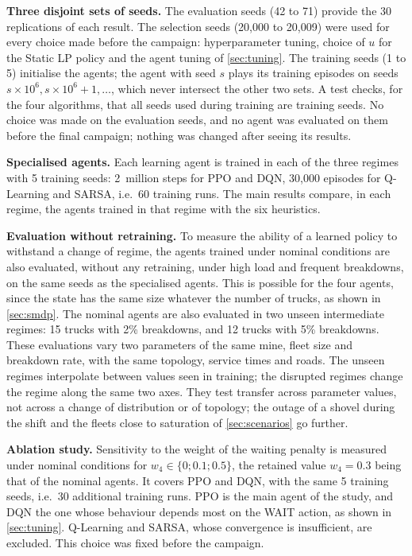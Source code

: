 \documentclass[11pt,a4paper]{article}
\newif\ifrevmarks
\newcommand{\revtag}[1]{\ifrevmarks\textsuperscript{\textcolor{red!70!black}{\scriptsize[#1]}}\fi}
\newenvironment{revbloc}[1]{\par\ifrevmarks\color{revcolor}\noindent\revtag{#1}\ \fi}{\par}
\newif\ifcorrmarks
\newcommand{\corr}[1]{\ifcorrmarks\textcolor{corrcolor}{#1}\else#1\fi}
\begin{document}
\begin{revbloc}{M1, M7, m19, A, v3}
\textbf{Three disjoint sets of seeds.} The evaluation seeds (42 to 71) provide the 30 replications of each result. The selection seeds (20{,}000 to 20{,}009) were used for every choice made before the campaign: hyperparameter tuning, choice of $u$ for the \corr{Static LP} policy and the agent tuning of \cref{sec:tuning}. The training seeds (1 to 5) initialise the agents; the agent with seed $s$ plays its training episodes on seeds $s \times 10^6, s \times 10^6 + 1, \ldots$, which never intersect the other two sets. A test checks, for the four algorithms, that all seeds used during training are training seeds. No choice was made on the evaluation seeds, and no agent was evaluated on them before the final campaign; nothing was changed after seeing its results.

\textbf{Specialised agents.} Each learning agent is trained in each of the three regimes with 5 training seeds: 2~million steps for PPO and DQN, 30{,}000 episodes for Q-Learning and SARSA, i.e.\ 60 training runs. The main results compare, in each regime, the agents trained in that regime with the six heuristics.

\textbf{Evaluation without retraining.} To measure the ability of a learned policy to withstand a change of regime, the agents trained under nominal conditions are also evaluated, without any retraining, under high load and frequent breakdowns, on the same seeds as the specialised agents. This is possible for the four agents, since the state has the same size whatever the number of trucks, as shown in \cref{sec:smdp}. The nominal agents are also evaluated in two unseen intermediate regimes: 15 trucks with 2\% breakdowns, and 12 trucks with 5\% breakdowns. \corr{These evaluations vary two parameters of the same mine, fleet size and breakdown rate, with the same topology, service times and roads. The unseen regimes interpolate between values seen in training; the disrupted regimes change the regime along the same two axes. They test transfer across parameter values, not across a change of distribution or of topology; the outage of a shovel during the shift and the fleets close to saturation of \cref{sec:scenarios} go further.}

\textbf{Ablation study.} Sensitivity to the weight of the waiting penalty is measured under nominal conditions for $w_4 \in \{0; 0.1; 0.5\}$, the retained value $w_4 = 0.3$ being that of the nominal agents. It covers PPO and DQN, with the same 5 training seeds, i.e.\ 30 additional training runs. PPO is the main agent of the study, and DQN the one whose behaviour depends most on the WAIT action, as shown in \cref{sec:tuning}. Q-Learning and SARSA, whose convergence is insufficient, are excluded. This choice was fixed before the campaign.


\end{revbloc}
\end{document}
